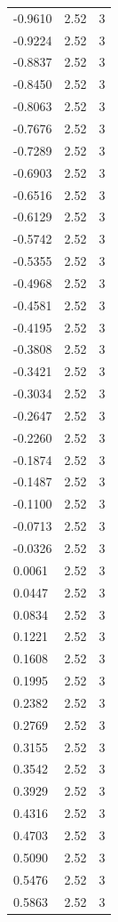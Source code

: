 \begin{longtable}{lrr}
  -0.9610 & 2.52 & 3 \\
  -0.9224 & 2.52 & 3 \\
  -0.8837 & 2.52 & 3 \\
  -0.8450 & 2.52 & 3 \\
  -0.8063 & 2.52 & 3 \\
  -0.7676 & 2.52 & 3 \\
  -0.7289 & 2.52 & 3 \\
  -0.6903 & 2.52 & 3 \\
  -0.6516 & 2.52 & 3 \\
  -0.6129 & 2.52 & 3 \\
  -0.5742 & 2.52 & 3 \\
  -0.5355 & 2.52 & 3 \\
  -0.4968 & 2.52 & 3 \\
  -0.4581 & 2.52 & 3 \\
  -0.4195 & 2.52 & 3 \\
  -0.3808 & 2.52 & 3 \\
  -0.3421 & 2.52 & 3 \\
  -0.3034 & 2.52 & 3 \\
  -0.2647 & 2.52 & 3 \\
  -0.2260 & 2.52 & 3 \\
  -0.1874 & 2.52 & 3 \\
  -0.1487 & 2.52 & 3 \\
  -0.1100 & 2.52 & 3 \\
  -0.0713 & 2.52 & 3 \\
  -0.0326 & 2.52 & 3 \\
  0.0061 & 2.52 & 3 \\
  0.0447 & 2.52 & 3 \\
  0.0834 & 2.52 & 3 \\
  0.1221 & 2.52 & 3 \\
  0.1608 & 2.52 & 3 \\
  0.1995 & 2.52 & 3 \\
  0.2382 & 2.52 & 3 \\
  0.2769 & 2.52 & 3 \\
  0.3155 & 2.52 & 3 \\
  0.3542 & 2.52 & 3 \\
  0.3929 & 2.52 & 3 \\
  0.4316 & 2.52 & 3 \\
  0.4703 & 2.52 & 3 \\
  0.5090 & 2.52 & 3 \\
  0.5476 & 2.52 & 3 \\
  0.5863 & 2.52 & 3 \\

\end{longtable}
